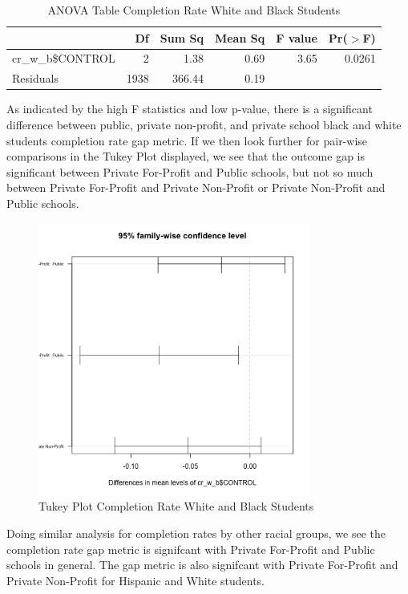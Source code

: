 \documentclass{article}
\begin{document}
\begin{table}[ht]
\centering
\begin{tabular}{lrrrrr}
  \hline
 & Df & Sum Sq & Mean Sq & F value & Pr($>$F) \\ 
  \hline
cr\_w\_b\$CONTROL & 2 & 1.38 & 0.69 & 3.65 & 0.0261 \\ 
  Residuals      & 1938 & 366.44 & 0.19 &  &  \\ 
   \hline
\end{tabular}
\caption{ANOVA Table Completion Rate White and Black Students} 
\end{table}
As indicated by the high F statistics and low p-value, there is a significant difference between public, private non-profit, and private school black and white students completion rate gap metric. If we then look further for pair-wise comparisons in the Tukey Plot displayed, we see that the outcome gap is significant between Private For-Profit and Public schools, but not so much between Private For-Profit and Private Non-Profit or Private Non-Profit and Public schools.

\begin{figure}
\centering
\includegraphics[width=0.8\textwidth]{../images/completion_rate_tukeyplot_white_black.png}
\caption{\label{fig:TukeyPlot}Tukey Plot Completion Rate White and Black Students}
\end{figure}

Doing similar analysis for completion rates by other racial groups, we see the completion rate gap metric is signifcant with Private For-Profit and Public schools in general. The gap metric is also signifcant with Private For-Profit and Private Non-Profit for Hispanic and White students.
\end{document}
